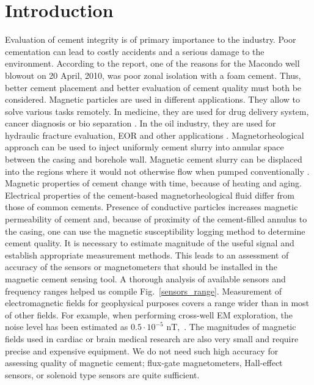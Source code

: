 \documentclass[10pt,twoside]{article}
\begin{document}
\section{Introduction}
\label{Sec:Intro}

Evaluation of cement integrity is of primary importance to the industry. Poor cementation can lead to costly accidents and a serious damage to the environment. According to the \citet{Bp2010} report, one of the reasons for the Macondo well blowout on 20 April, 2010, was poor zonal isolation with a foam cement. Thus, better cement placement and better evaluation of cement quality must both be considered. Magnetic particles are used in different applications. They allow to solve various tasks remotely. In medicine, they are used for drug delivery system, cancer diagnosis or bio separation \citep{Ito2005}. In the oil industry, they are used for hydraulic fracture evaluation, EOR and other applications \citep{Guo2015}. Magnetorheological approach can be used to inject uniformly cement slurry into annular space between the casing and borehole wall. Magnetic cement slurry can be displaced into the regions where it would not otherwise flow when pumped conventionally \citep{Nair2013}. Magnetic properties of cement change with time, because of heating and aging. Electrical properties of the cement-based magnetorheological fluid differ from those of common cements. Presence of conductive particles increases magnetic permeability of cement \citep{Nair2016} and, because of proximity of the cement-filled annulus to the casing, one can use the magnetic susceptibility logging method to determine cement quality. It is necessary to estimate magnitude of the useful signal and establish appropriate measurement methods. This leads to an assessment of accuracy of the sensors or magnetometers that should be installed in the magnetic cement sensing tool. A thorough analysis of available sensors and frequency ranges helped us compile Fig.~\ref{sensors_range}. Measurement of electromagnetic fields for geophysical purposes covers a range wider than in most of other fields. For example, when performing cross-well EM exploration, the noise level has been estimated as $0.5 \cdot 10^{-5}$ nT,~\citep{Marsala2015}. The magnitudes of magnetic fields used in cardiac or brain medical research are also very small and require precise and expensive equipment. We do not need such high accuracy for assessing quality of magnetic cement; flux-gate magnetometers, Hall-effect sensors, or solenoid type sensors are quite sufficient.
\end{document}
